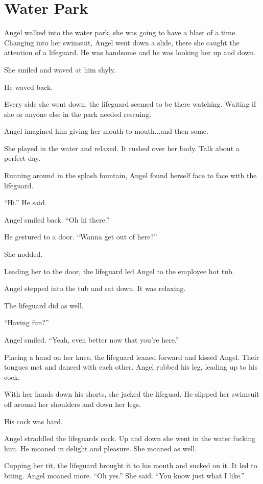 \section{Water Park}

    Angel walked into the water park, she was going to have a blast of a time. Changing into her swimsuit, Angel went down a slide, there she caught the attention of a lifeguard. He was handsome and he was looking her up and down.

    She smiled and waved at him shyly.

    He waved back.

    Every side she went down, the lifeguard seemed to be there watching. Waiting if she or anyone else in the park needed rescuing.

    Angel imagined him giving her mouth to mouth...and then some.

    She played in the water and relaxed. It rushed over her body. Talk about a perfect day.

    Running around in the splash fountain, Angel found herself face to face with the lifeguard.

    “Hi.” He said.

    Angel smiled back. “Oh hi there.”

    He gestured to a door. “Wanna get out of here?”

    She nodded.

    Leading her to the door, the lifeguard led Angel to the employee hot tub.

    Angel stepped into the tub and sat down. It was relaxing.

    The lifeguard did as well.

    “Having fun?”

    Angel smiled. “Yeah, even better now that you’re here.”

    Placing a hand on her knee, the lifeguard leaned forward and kissed Angel. Their tongues met and danced with each other. Angel rubbed his leg, leading up to his cock.

    With her hands down his shorts, she jacked the lifeguad. He slipped her swimsuit off around her shoulders and down her legs.

    His cock was hard.

    Angel straddled the lifeguards cock. Up and down she went in the water fucking him. He moaned in delight and pleasure. She moaned as well.

    Cupping her tit, the lifeguard brought it to his mouth and sucked on it. It led to biting. Angel moaned more. “Oh yes.” She said. “You know just what I like.”

